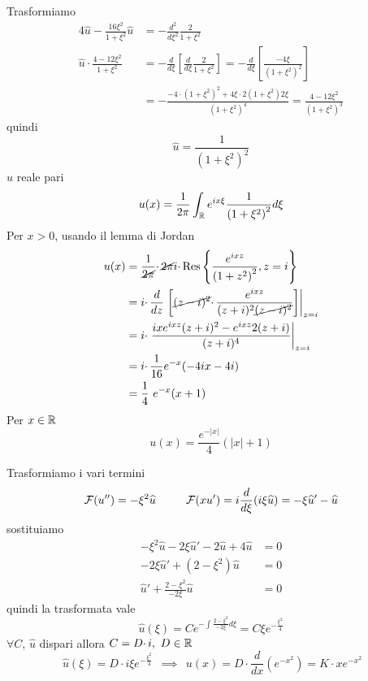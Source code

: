 Trasformiamo
\begin{align*}
4\hat{u} -\frac{16\xi ^{2}}{1+\xi ^{2}}\hat{u} & =-\frac{d^{2}}{d\xi ^{2}}\frac{2}{1+\xi ^{2}}\\
\hat{u} \cdotp \frac{4-12\xi ^{2}}{1+\xi ^{2}} & =-\frac{d}{d\xi }\left[\frac{d}{d\xi }\frac{2}{1+\xi ^{2}}\right] =-\frac{d}{d\xi }\left[\frac{-4\xi }{\left( 1+\xi ^{2}\right)^{2}}\right]\\
 & =-\frac{-4\cdotp \left( 1+\xi ^{2}\right)^{2} +4\xi \cdotp 2\left( 1+\xi ^{2}\right) 2\xi }{\left( 1+\xi ^{2}\right)^{4}} =\frac{4-12\xi ^{2}}{\left( 1+\xi ^{2}\right)^{3}}
\end{align*}
quindi
\begin{equation*}
\hat{u} =\frac{1}{\left( 1+\xi ^{2}\right)^{2}}
\end{equation*}
$\hat{u}$ reale pari
\begin{equation*}
u( x) =\frac{1}{2\pi }\int _{\mathbb{R} } e^{ix\xi }\frac{1}{\left( 1+\xi ^{2}\right)^{2}} d\xi 
\end{equation*}
Per $x >0$, usando il lemma di Jordan
\begin{align*}
u( x) & =\frac{1}{\cancel{2\pi }} \cdotp \cancel{2\pi } i\cdotp \mathrm{Res}\left\{\frac{e^{ixz}}{\left( 1+z^{2}\right)^{2}} ,z=i\right\}\\
 & =i\cdotp \frac{d}{dz}\left. \left[\cancel{( z-i)^{2}} \cdotp \frac{e^{ixz}}{( z+i)^{2}\cancel{( z-i)^{2}}}\right]\right| _{z=i}\\
 & =i\cdotp \left. \frac{ixe^{ixz}( z+i)^{2} -e^{ixz} 2( z+i)}{( z+i)^{4}}\right| _{z=i}\\
 & =i\cdotp \frac{1}{16} e^{-x}( -4ix-4i)\\
 & =\frac{1}{4} \ e^{-x}( x+1)
\end{align*}
Per $x\in \mathbb{R} $
\begin{equation*}
u( x) =\frac{e^{-| x| }}{4}(| x| +1)
\end{equation*}
\Soluzione

Trasformiamo i vari termini
\begin{equation*}
\mathcal{F} ( u'') =-\xi ^{2}\widehat{u} \ \ \ \ \ \ \ \ \mathcal{F} ( xu') =i\frac{d}{d\xi }( i\xi \widehat{u}) =-\xi \widehat{u} '-\widehat{u}
\end{equation*}
sostituiamo
\begin{align*}
-\xi ^{2}\hat{u} -2\xi \hat{u} '-2\hat{u} +4\hat{u} & =0\\
-2\xi \hat{u} '+\left( 2-\xi ^{2}\right)\hat{u} & =0\\
\hat{u} '+\frac{2-\xi ^{2}}{-2\xi }\hat{u} & =0
\end{align*}
quindi la trasformata vale
\begin{equation*}
\hat{u}( \xi ) =Ce^{-\int \frac{2-\xi ^{2}}{-2\xi } d\xi } =C\xi e^{-\frac{\xi ^{2}}{4}}
\end{equation*}
$\forall C$, $\hat{u}$ dispari allora $C=D\cdotp i,\ D\in \mathbb{R} $
\begin{equation*}
\ \hat{u}( \xi ) =D\cdotp i\xi e^{-\frac{\xi ^{2}}{4}} \ \ \implies \ \ u( x) =D\cdotp \frac{d}{dx}\left( e^{-x^{2}}\right) =K\cdotp xe^{-x^{2}}
\end{equation*}

